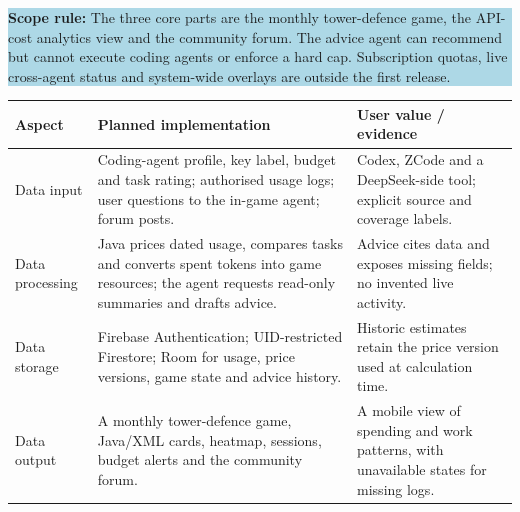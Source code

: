 \documentclass[10pt,a4paper]{article}
\newcommand{\sectkeep}[1]{\vspace{3pt}{\large\bfseries#1}\par\nobreak\vspace{1pt}}
\newcommand{\tagline}[1]{\colorbox{lightblue}{\parbox{\dimexpr\linewidth-2\fboxsep}{#1}}}
\begin{document}
\tagline{\textbf{Scope rule:} The three core parts are the monthly tower-defence game, the API-cost analytics view and the community forum. The advice agent can recommend but cannot execute coding agents or enforce a hard cap. Subscription quotas, live cross-agent status and system-wide overlays are outside the first release.}

\sectkeep{4. Planned functionality and the four data aspects}
\begin{tabularx}{\linewidth}{@{}>{\raggedright\arraybackslash}p{27mm}Y Y@{}}
\toprule
{}
\textbf{Aspect} & \textbf{Planned implementation} & \textbf{User value / evidence} \\
\midrule
Data input & Coding-agent profile, key label, budget and task rating; authorised usage logs; user questions to the in-game agent; forum posts. & Codex, ZCode and a DeepSeek-side tool; explicit source and coverage labels. \\
Data processing & Java prices dated usage, compares tasks and converts spent tokens into game resources; the agent requests read-only summaries and drafts advice. & Advice cites data and exposes missing fields; no invented live activity. \\
Data storage & Firebase Authentication; UID-restricted Firestore; Room for usage, price versions, game state and advice history. & Historic estimates retain the price version used at calculation time. \\
Data output & A monthly tower-defence game, Java/XML cards, heatmap, sessions, budget alerts and the community forum. & A mobile view of spending and work patterns, with unavailable states for missing logs. \\
\bottomrule
\end{tabularx}
\end{document}
